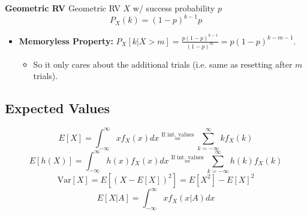 \begin{example} \textbf{Geometric RV}
    Geometric RV $X$ w/ success probability $p$ 
    \begin{equation}
        P_X(k) = (1-p)^{k-1}p
    \end{equation}

    \begin{itemize}
        \item \textbf{Memoryless Property:} $P_X[k|X > m] = \frac{p(1-p)^{k-1}}{(1-p)^m} = p(1-p)^{k-m-1}$. 
        \begin{itemize}
            \item So it only cares about the additional trials (i.e. same as resetting after $m$ trials).
        \end{itemize}
    \end{itemize}
    
\end{example}

\subsection{Expected Values}
\begin{definition}
    \begin{equation}
        E[X] = \int_{-\infty}^{\infty} x f_X(x) dx \overset{\text{If int. values}}{=} \sum_{k=-\infty}^{\infty} k f_X(k)
    \end{equation}
    \begin{equation}
        E[h(X)] = \int_{-\infty}^{\infty} h(x) f_X(x) dx \overset{\text{If int. values}}{=} \sum_{k=-\infty}^{\infty} h(k) f_X(k)
    \end{equation}
    \begin{equation}
        \text{Var}[X] = E[(X - E[X])^2] = E[X^2] - E[X]^2
    \end{equation}
    \begin{equation}
        E[X|A] = \int_{-\infty}^{\infty} x f_{X}(x|A) dx
    \end{equation}
\end{definition}

